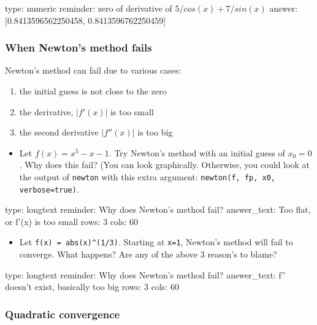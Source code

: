 \documentclass[12pt]{article}
\begin{document}
\begin{answer}
    type: numeric
    reminder: zero of derivative of \( 5/cos(x) + 7/sin(x) \)
    answer: [0.8413596562250458, 0.8413596762250459]

\end{answer}

\subsubsection{When Newton's method fails}

Newton's method can fail due to various cases:

\begin{enumerate}
\def\labelenumi{\arabic{enumi})}
\item
  the initial guess is not close to the zero
\item
  the derivative, $\vert f'(x)\vert $ is too small
\item
  the second derivative $\vert f''(x)\vert $ is too big
\end{enumerate}

\begin{itemize}
\itemsep1pt\parskip0pt
\item
  Let $f(x) = x^5 - x - 1$. Try Newton's method with an initial guess of
  $x_0=0$. Why does this fail? (You can look graphically. Otherwise, you
  could look at the output of \texttt{newton} with this extra argument:
  \texttt{newton(f, fp, x0, verbose=true)}.
\end{itemize}

\begin{answer}
type: longtext
reminder: Why does Newton's method fail?
answer_text: Too flat, or f'(x) is too small 
rows: 3
cols: 60
\end{answer}

\begin{itemize}
\itemsep1pt\parskip0pt
\item
  Let \texttt{f(x) = abs(x)\^{}(1/3)}. Starting at \texttt{x=1},
  Newton's method will fail to converge. What happens? Are any of the
  above 3 reason's to blame?
\end{itemize}

\begin{answer}
type: longtext
reminder: Why does Newton's method fail?
answer_text: f'' doesn't exist, basically too big 
rows: 3
cols: 60
\end{answer}

\subsubsection{Quadratic convergence}
\end{document}
